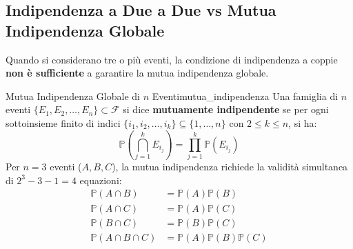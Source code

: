 \subsection{Indipendenza a Due a Due vs Mutua Indipendenza Globale}

Quando si considerano tre o più eventi, la condizione di indipendenza a coppie \textbf{non è sufficiente} a garantire la mutua indipendenza globale.

\begin{definizione}{Mutua Indipendenza Globale di $n$ Eventi}{mutua_indipendenza}
Una famiglia di $n$ eventi $\{E_1, E_2, \dots, E_n\} \subset \mathcal{F}$ si dice \textbf{mutuamente indipendente} se per ogni sottoinsieme finito di indici $\{i_1, i_2, \dots, i_k\} \subseteq \{1, \dots, n\}$ con $2 \le k \le n$, si ha:
\begin{equation}
    \mathbb{P}\left(\bigcap_{j=1}^k E_{i_j}\right) = \prod_{j=1}^k \mathbb{P}(E_{i_j})
\end{equation}
Per $n = 3$ eventi ($A, B, C$), la mutua indipendenza richiede la validità simultanea di $2^3 - 3 - 1 = 4$ equazioni:
\begin{align}
    \mathbb{P}(A \cap B) &= \mathbb{P}(A)\mathbb{P}(B) \\
    \mathbb{P}(A \cap C) &= \mathbb{P}(A)\mathbb{P}(C) \\
    \mathbb{P}(B \cap C) &= \mathbb{P}(B)\mathbb{P}(C) \\
    \mathbb{P}(A \cap B \cap C) &= \mathbb{P}(A)\mathbb{P}(B)\mathbb{P}(C)
\end{align}
\end{definizione}

